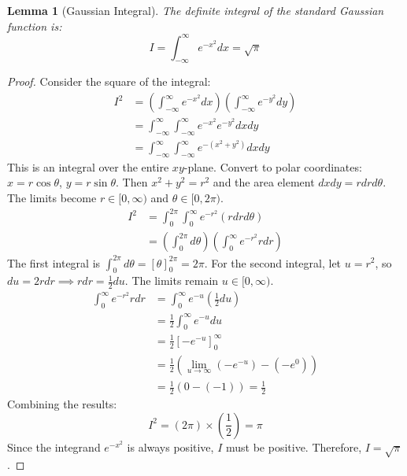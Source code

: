 \documentclass[11pt, letterpaper]{article}
\newtheorem{lemma}[theorem]{Lemma}
\theoremstyle{definition}
\theoremstyle{remark}
\begin{document}
\begin{lemma}[Gaussian Integral]
The definite integral of the standard Gaussian function is:
$$ I = \int_{-\infty}^{\infty} e^{-x^2} dx = \sqrt{\pi} $$
\end{lemma}
\begin{proof}
Consider the square of the integral:
\begin{align*}
    I^2 &= \left( \int_{-\infty}^{\infty} e^{-x^2} dx \right) \left( \int_{-\infty}^{\infty} e^{-y^2} dy \right) \\
        &= \int_{-\infty}^{\infty} \int_{-\infty}^{\infty} e^{-x^2} e^{-y^2} dx dy \\
        &= \int_{-\infty}^{\infty} \int_{-\infty}^{\infty} e^{-(x^2+y^2)} dx dy
\end{align*}
This is an integral over the entire $xy$-plane. Convert to polar coordinates: $x = r \cos \theta$, $y = r \sin \theta$. Then $x^2+y^2 = r^2$ and the area element $dx dy = r dr d\theta$. The limits become $r \in [0, \infty)$ and $\theta \in [0, 2\pi)$.
\begin{align*}
    I^2 &= \int_{0}^{2\pi} \int_{0}^{\infty} e^{-r^2} (r dr d\theta) \\
        &= \left( \int_{0}^{2\pi} d\theta \right) \left( \int_{0}^{\infty} e^{-r^2} r dr \right)
\end{align*}
The first integral is $\int_{0}^{2\pi} d\theta = [\theta]_0^{2\pi} = 2\pi$.
For the second integral, let $u = r^2$, so $du = 2r dr \implies r dr = \frac{1}{2} du$. The limits remain $u \in [0, \infty)$.
\begin{align*}
    \int_{0}^{\infty} e^{-r^2} r dr &= \int_{0}^{\infty} e^{-u} \left(\frac{1}{2} du\right) \\
    &= \frac{1}{2} \int_{0}^{\infty} e^{-u} du \\
    &= \frac{1}{2} [-e^{-u}]_0^{\infty} \\
    &= \frac{1}{2} ( \lim_{u\to\infty}(-e^{-u}) - (-e^0) ) \\
    &= \frac{1}{2} (0 - (-1)) = \frac{1}{2}
\end{align*}
Combining the results:
$$ I^2 = (2\pi) \times \left(\frac{1}{2}\right) = \pi $$
Since the integrand $e^{-x^2}$ is always positive, $I$ must be positive. Therefore, $I = \sqrt{\pi}$.
\end{proof}

\end{document}
